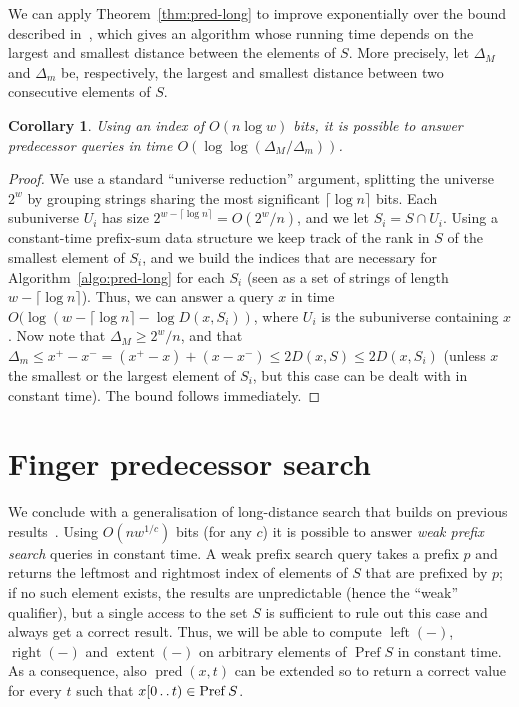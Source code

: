 \documentclass[a4paper,11pt]{article}
\newtheorem{corollary}[theorem]{Corollary}
\newcommand{\?}{\mskip1.5mu}
\def\..{\,\mathpunct{\ldotp\ldotp}} %
\DeclareMathOperator{\lrange}{left}
\DeclareMathOperator{\rrange}{right}
\DeclareMathOperator{\extent}{extent}
\DeclareMathOperator{\Pref}{Pref}
\DeclareMathOperator{\pred}{pred}
\begin{document}
We can apply Theorem~\ref{thm:pred-long} to improve exponentially over the bound
described in~\cite{DemaineJoPa04}, which gives an algorithm whose running time
depends on the largest and smallest distance between the elements of $S$. 
More precisely, let
$\Delta_M$ and $\Delta_m$ be, respectively, the largest and smallest distance
between two consecutive elements of $S$.
\begin{corollary}
\label{cor:deltadelta}
Using an index of $O(n\log w)$ bits, it is possible to answer predecessor
queries in time $O(\log\log(\Delta_M/\Delta_m))$.
\end{corollary}
\begin{proof}
We use a standard ``universe reduction'' argument, splitting 
the universe $2^w$ by grouping strings sharing the most significant $\lceil \log
n\rceil$ bits. Each subuniverse $U_i$ has size $2^{w-\lceil \log
n\rceil}=O(2^w/n)$, and we let $S_i=S\cap U_i$. Using a constant-time
prefix-sum data structure we keep track of the rank in $S$ of the smallest
element of $S_i$, and we build the indices that are necessary for
Algorithm~\ref{algo:pred-long} for each $S_i$ (seen as a set of strings of
length $w-\lceil \log
n\rceil$). Thus, we can answer a query $x$ in time $O(\log(w-\lceil \log
n\rceil -\log D(x,S_i))$, where $U_i$ is the subuniverse containing $x$. Now
note that $\Delta_M\geq 2^w/n$, and that $\Delta_m\leq x^+-x^-
=(x^+-x)+(x-x^-)\leq 2D(x,S)\leq 2D(x,S_i)$ (unless $x$ the smallest or the
largest element of $S_i$, but this case can be dealt with in constant time). The
bound follows immediately.
\end{proof}

\section{Finger predecessor search}

We conclude with a generalisation of long-distance search that builds on previous results~\cite{BelazzouguiBoPaVi11b}.
Using $O(n w^{1/c})$ bits (for any $c$) it
is possible to answer \emph{weak prefix search} queries in constant time. A weak
prefix search query takes a prefix $p$ and returns the leftmost and rightmost
index of elements of $S$ that are prefixed by $p$; if no such element exists,
the results are unpredictable (hence the ``weak'' qualifier), but a single access to the set $S$ is sufficient
to rule out this case and always get a correct result. Thus, we will be
able to compute $\lrange(-)$, $\rrange(-)$ and $\extent(-)$ on arbitrary
elements of $\Pref S$ in constant time. As a consequence, also $\pred(x,t)$ can
be extended so to return a correct value for every $t$ such that
$x[0\..t)\in\Pref S$.
\end{document}
